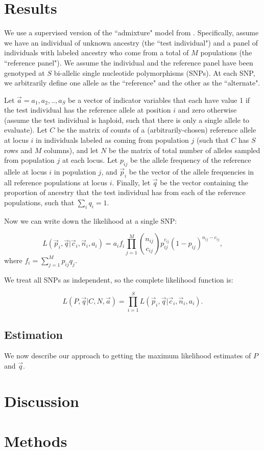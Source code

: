 \documentclass[11pt,titlepage]{article}
\begin{document}
\section{Results}
We use a supervised version of the ``admixture" model from \citet{Pritchard:2000zr}. 
Specifically, assume we have an individual of unknown ancestry (the ``test individual") and a panel of individuals with labeled ancestry who come from a total of $M$ populations (the ``reference panel"). 
We assume the individual and the reference panel have been genotyped at $S$ bi-allelic single nucleotide polymorphisms (SNPs).
 At each SNP, we arbitrarily define one allele as the ``reference" and the other as the ``alternate". 
 
 Let $\vec a = {a_1, a_2, .., a_S}$ be a vector of indicator variables that each have value 1 if the test individual has the reference allele at position $i$ and zero otherwise (assume the test individual is haploid, such that there is only a single allele to evaluate). 
Let $C$ be the matrix of counts of a (arbitrarily-chosen) reference allele at locus $i$ in individuals labeled as coming from population $j$ (such that $C$ has $S$ rows and $M$ columns), and let $N$ be the matrix of total number of alleles sampled from population $j$ at each locus. 
Let $p_{ij}$ be the allele frequency of the reference allele at locus $i$ in population $j$, and $\vec p_i$ be the vector of the allele frequencies in all reference populations at locus $i$. 
 Finally, let $\vec q$ be the vector containing the proportion of ancestry that the test individual has from each of the reference populations, such that $\sum_i q_i = 1$. 

Now we can write down the likelihood at a single SNP:

\begin{equation}
L(\vec p_i, \vec q | \vec c_i, \vec n_i, a_i) = a_i f_i \prod  \limits_{j = 1}^M {n_{ij} \choose c_{ij}} p_{ij}^{c_{ij}} (1-p_{ij})^{n_{ij}- c_{ij}} , 
\end{equation}
\noindent where $f_i = \sum \limits_{j = 1}^{M} p_{ij} q_j$.  

We treat all SNPs as independent, so the complete likelihood function is:

\begin{equation}
L(P, \vec q | C,  N, \vec a) = \prod \limits_{i = 1}^{S} L(\vec p_i, \vec q | \vec c_i, \vec n_i, a_i).
\end{equation}

\subsection{Estimation}
We now describe our approach to getting the maximum likelihood estimates of $P$ and $\vec q$. 

\section{Discussion}

\section{Methods}

\end{document}
